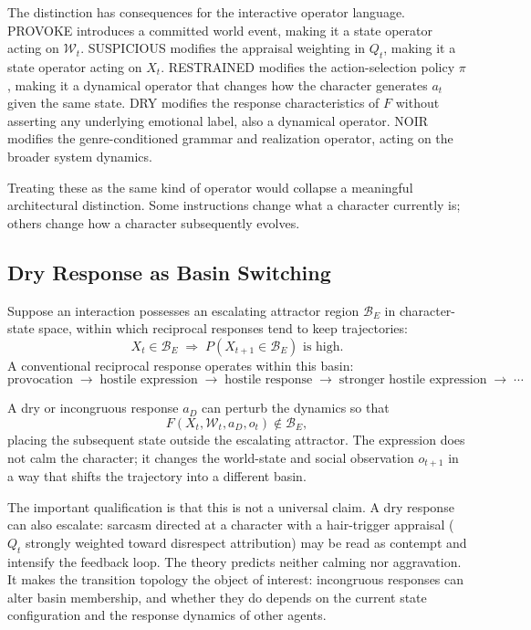 \documentclass[11pt,a4paper]{article}
\theoremstyle{plain}
\theoremstyle{definition}
\theoremstyle{remark}
\begin{document}
\begin{center}
\end{center}

The distinction has consequences for the interactive operator language. \textsc{PROVOKE} introduces a committed world event, making it a state operator acting on $\mathcal{W}_t$. \textsc{SUSPICIOUS} modifies the appraisal weighting in $Q_t$, making it a state operator acting on $X_t$. \textsc{RESTRAINED} modifies the action-selection policy $\pi$, making it a dynamical operator that changes how the character generates $a_t$ given the same state. \textsc{DRY} modifies the response characteristics of $F$ without asserting any underlying emotional label, also a dynamical operator. \textsc{NOIR} modifies the genre-conditioned grammar and realization operator, acting on the broader system dynamics.

Treating these as the same kind of operator would collapse a meaningful architectural distinction. Some instructions change what a character currently is; others change how a character subsequently evolves.

\subsection{Dry Response as Basin Switching}

Suppose an interaction possesses an escalating attractor region $\mathcal{B}_E$ in character-state space, within which reciprocal responses tend to keep trajectories:
\[
X_t \in \mathcal{B}_E \;\Rightarrow\; P(X_{t+1} \in \mathcal{B}_E) \text{ is high.}
\]
A conventional reciprocal response operates within this basin:
\[
\text{provocation} \;\to\; \text{hostile expression} \;\to\; \text{hostile response} \;\to\; \text{stronger hostile expression} \;\to\; \cdots
\]

A dry or incongruous response $a_D$ can perturb the dynamics so that
\[
F(X_t, \mathcal{W}_t, a_D, o_t) \notin \mathcal{B}_E,
\]
placing the subsequent state outside the escalating attractor. The expression does not calm the character; it changes the world-state and social observation $o_{t+1}$ in a way that shifts the trajectory into a different basin.

The important qualification is that this is not a universal claim. A dry response can also escalate: sarcasm directed at a character with a hair-trigger appraisal ($Q_t$ strongly weighted toward disrespect attribution) may be read as contempt and intensify the feedback loop. The theory predicts neither calming nor aggravation. It makes the transition topology the object of interest: incongruous responses can alter basin membership, and whether they do depends on the current state configuration and the response dynamics of other agents.
\end{document}
